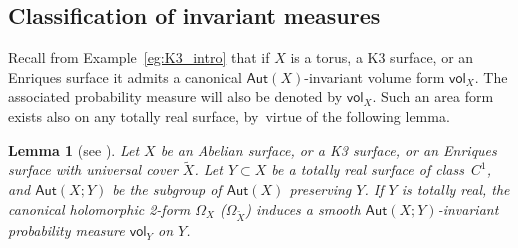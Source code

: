 \documentclass[JEP,XML,SOM,Unicode,published]{cedram}
\newcommand\Aut{\mathsf{Aut}}
\newcommand{\vol}{{\mathsf{vol}}}
\theoremstyle{plain}
\newtheorem{lem}[thm]{Lemma}
\theoremstyle{definition}
\begin{document}
\subsection{Classification of invariant measures}

Recall from Example~\ref{eg:K3_intro} that if $X$ is a torus, a K3 surface, or an Enriques surface it admits a canonical $\Aut(X)$-invariant volume form $\vol_X$. The associated probability measure will also be denoted by $\vol_X$. Such an area form exists also on any totally real surface, by~virtue of the following lemma.

\begin{lem}[{see \cite[Rem.\,2.3]{invariant}}]\label{lem:volume_Y}
Let $X$ be an Abelian surface, or a K3 surface, or an Enriques surface with universal cover $\tilde{X}$.
Let $Y\subset X$ be a totally real surface of class~$C^1$, and $\Aut(X;Y)$ be the
subgroup of $\Aut(X)$ preserving $Y$.
If $Y$ is totally real, the canonical holomorphic 2-form
$\Omega_X$ (\resp $\Omega_{\tilde{X}}$) induces a smooth $\Aut(X;Y)$-invariant probability
measure $\vol_Y$ on $Y$.
\end{lem}
\end{document}
